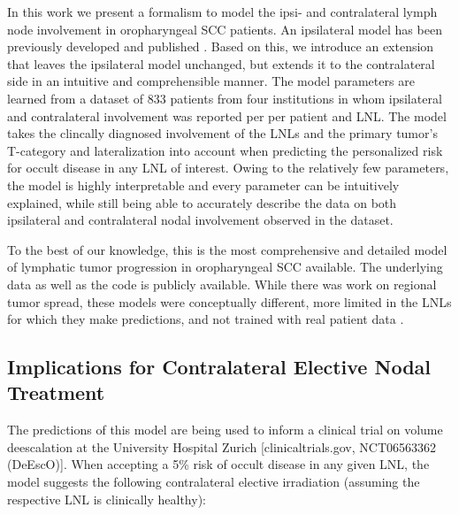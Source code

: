 \documentclass[
  sn-mathphys-num,
]{sn-jnl}
\begin{document}
In this work we present a formalism to model the ipsi- and contralateral
lymph node involvement in oropharyngeal SCC patients. An ipsilateral
model has been previously developed and published
\citep{ludwig_hidden_2021, ludwig_modelling_2023}. Based on this, we
introduce an extension that leaves the ipsilateral model unchanged, but
extends it to the contralateral side in an intuitive and comprehensible
manner. The model parameters are learned from a dataset of 833 patients
from four institutions in whom ipsilateral and contralateral involvement
was reported per per patient and LNL. The model takes the clincally
diagnosed involvement of the LNLs and the primary tumor's T-category and
lateralization into account when predicting the personalized risk for
occult disease in any LNL of interest. Owing to the relatively few
parameters, the model is highly interpretable and every parameter can be
intuitively explained, while still being able to accurately describe the
data on both ipsilateral and contralateral nodal involvement observed in
the dataset.

To the best of our knowledge, this is the most comprehensive and
detailed model of lymphatic tumor progression in oropharyngeal SCC
available. The underlying data as well as the code is publicly
available. While there was work on regional tumor spread, these models
were conceptually different, more limited in the LNLs for which they
make predictions, and not trained with real patient data
\citep{benson_markov_2006, jung_development_2017}.

\subsection{Implications for Contralateral Elective Nodal
Treatment}\label{implications-for-contralateral-elective-nodal-treatment}

The predictions of this model are being used to inform a clinical trial
on volume deescalation at the University Hospital Zurich
{[}clinicaltrials.gov, NCT06563362 (DeEscO){]}. When accepting a 5\%
risk of occult disease in any given LNL, the model suggests the
following contralateral elective irradiation (assuming the respective
LNL is clinically healthy):
\end{document}

